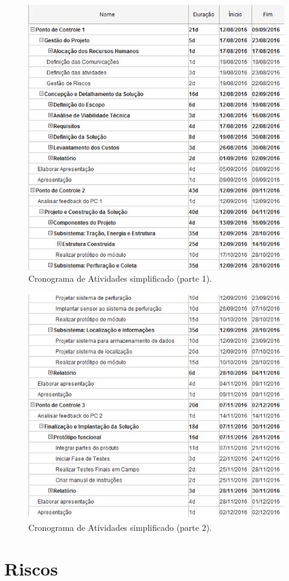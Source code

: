 \begin{figure}[!htbp]
\begin{center}
\includegraphics[width=\textwidth]{figuras/cronograma_simples_1.png}
\caption{\label{fig:cron_s1}Cronograma de Atividades simplificado (parte 1).}
\end{center}
\end{figure}

\begin{figure}[!htbp]
\begin{center}
\includegraphics[width=\textwidth]{figuras/cronograma_simples_2.png}
\caption{\label{fig:cron_s2}Cronograma de Atividades simplificado (parte 2).}
\end{center}
\end{figure}

  \section{Riscos}
  
